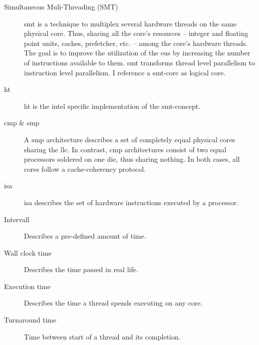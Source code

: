 \begin{description}
  \item[Simultaneous Muli-Threading (SMT)] \gls{smt} is a technique to
    multiplex several hardware threads on the same physical core.
    Thus, sharing all the core's resources -- integer and floating point units,
    caches, prefetcher, etc. -- among the core's hardware threads.
    The goal is to improve the utilization of the \gls{eu}s by increasing
    the number of instructions available to them.
    \gls{smt} transforms thread level parallelism to instruction level
    parallelism.
    I reference a \gls{smt}-core as logical core.

  \item[\Gls{ht}] \gls{ht} is the \gls{intel} specific implementation of the
    \gls{smt}-concept.

  \item[\Gls{cmp}  \& \Gls{smp}]
    A \Gls{smp} architecture describes a set of completely equal physical
    cores sharing the \gls{llc}.
    In contrast, \Gls{cmp} architectures consist of two equal processors
    soldered on one die, thus sharing nothing.
    In both cases, all cores follow a cache-coherency protocol.

  \item[\Gls{isa}]\gls{isa} describes the set of hardware instructions executed
    by a processor.

  \item[Intervall] Describes a pre-defined amount of time.
  \item[Wall clock time] Describes the time passed in real life.
  \item[Execution time] Describes the time a thread spends executing on any
    core.
  \item[Turnaround time] Time between start of a thread and its completion.




\end{description}
